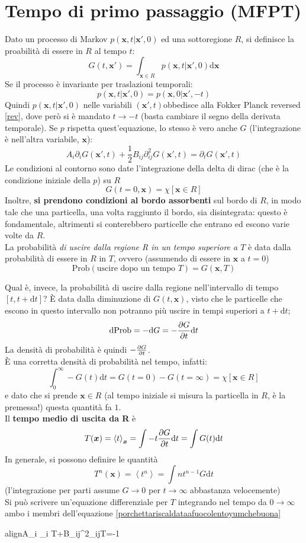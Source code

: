 \documentclass[a4paper,12pt]{article}
\newcommand{\boxedeq}[2]{\begin{empheq}[box={\fboxsep=6pt\fbox}]{align}\label{#1}#2\end{empheq}}
\theoremstyle{plain}
\renewcommand{\vec}[1]{{\boldsymbol{#1}}}
\theoremstyle{definition}
\newcommand{\f}[2]{\frac{#1}{#2}}
\newcommand{\ave}[1]{\left\langle#1\right\rangle }
\newcommand{\tdv}{\partial_t}
\renewcommand{\d}{\text{d}}
\newcommand{\pos}{\vec{x}}
\newcommand{\ra}{\rightarrow}
\theoremstyle{remark}
\begin{document}
\section{Tempo di primo passaggio (MFPT)}
Dato un processo di Markov $p(\pos,t |\pos',0)$ ed una sottoregione $R$, si definisce la proabilità di essere in $R$ al tempo $t$:\[G(t,\pos')=\int_{\pos\in R}p(\pos,t |\pos',0) \d \pos		\]
Se il processo è invariante per traslazioni temporali:
\[p(\pos,t |\pos',0)=p(\pos,0 |\pos',-t)\]
Quindi $p(\pos,t |\pos',0)$ nelle variabili $(\pos',t) $obbedisce alla Fokker Planck reversed \ref{rev}, dove però si è mandato $t\ra -t$ (basta cambiare il segno della derivata temporale). Se $p$ rispetta quest'equazione, lo stesso è vero anche $G$ (l'integrazione è nell'altra variabile, $\pos$):
\begin{equation}
A_i\partial_i	G(\pos',t)+\f{1}{2}B_{ij}\partial^2_{ij}G(\pos',t)=\tdv G(\pos',t)\label{porchettariscaldataafuocolentoyumchebuona}
\end{equation}
Le condizioni al contorno sono date l'integrazione della delta di dirac (che è la condizione iniziale della $p$) su $R$ 
\[G(t=0,\pos)=\chi[\pos\in R]		\]
Inoltre, \textbf{si prendono condizioni al bordo assorbenti} sul bordo di $R$, in modo tale che una particella, una volta raggiunto il bordo, sia disintegrata: questo è fondamentale, altrimenti si conterebbero particelle che entrano ed escono varie volte da $R$.	\\
La probabilità \emph{di uscire dalla regione R in un tempo  superiore a $T$} è data dalla probabilità di essere in $R$ in $ T$, ovvero (assumendo di essere in $\pos$ a $t=0$)
 \[\text{Prob}(\text{uscire dopo un tempo } T)=G(\pos, T)\]
 
 Qual è, invece, la probabilità di uscire  dalla regione nell'intervallo di tempo $[t,t+\d t]$? È data dalla diminuzione di $G(t,\pos)$, visto che le particelle che escono in questo intervallo non potranno più uscire in tempi superiori a $t+\d t$; 
 \[\d \text{Prob}=	-\d G=-\pdv{G}{t} \d t	\]
La densità di probabilità è quindi $-\pdv{G}{t} $.\\
È una corretta densità di probabilità nel tempo, infatti:
\[\int_0^\infty	-G(t)\d t=	G(t=0)-G(t=\infty)=\chi{[\pos\in R]}\]
e dato che si prende $\pos\in R$ (al tempo iniziale si misura la particella in $R$, è la premessa!) questa quantità fa $1$.
\\
Il \textbf{tempo medio di uscita da R} è
 \[T(\pos)=\ave{t}_\pos=\int -	t \pdv{G}{t}\d t =\int G(t)\d t		\]
 In  generale, si possono definire le quantità
 \[T^n(\pos)=\ave{t^n}=\int n 	{t^{n-1}}{G}\d t 		\]
 (l'integrazione per parti assume $G\ra 0$ per $t\ra\infty$ abbastanza velocemente)
 \\
 Si può scrivere un'equazione differenziale per $T$ integrando nel tempo da $0\ra \infty$ ambo i membri dell'equazione \ref{porchettariscaldataafuocolentoyumchebuona} 
 \boxedeq{MFPT}{A_i \partial_{i} T+\f{1}{2}B_{ij}\partial^2_{ij}T=-1			
 }
\end{document}
